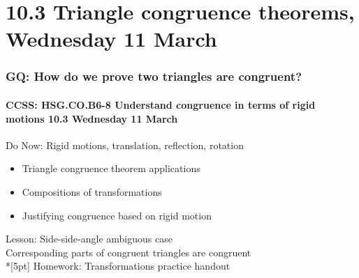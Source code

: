 \documentclass{beamer}
\begin{document}
\section{10.3 Triangle congruence theorems, Wednesday 11 March} 
\frame
{
  \frametitle{GQ: How do we prove two triangles are congruent?}
  \framesubtitle{CCSS: HSG.CO.B6-8 Understand congruence in terms of rigid motions \hfill \alert{10.3 Wednesday 11 March}}

  \begin{block}{Do Now: Rigid motions, translation, reflection, rotation}
    \begin{itemize}
      \item Triangle congruence theorem applications
      \item Compositions of transformations
      \item Justifying congruence based on rigid motion
    \end{itemize}
    \end{block}
    Lesson: Side-side-angle ambiguous case \\
    Corresponding parts of congruent triangles are congruent\\*[5pt]
    Homework: Transformations practice handout
}
\end{document}
